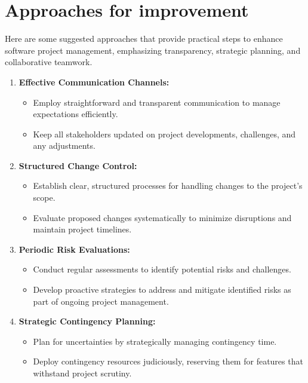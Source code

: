 \documentclass[12pt]{article}
\begin{document}
\section{Approaches for improvement }
Here are some suggested approaches that provide practical steps to enhance software project management, emphasizing transparency, strategic planning, and collaborative teamwork.
   \begin{enumerate}
               \item \textbf{Effective Communication Channels:} 
               \begin{itemize}
                    \item  Employ straightforward and transparent communication to manage expectations efficiently.
                    \item Keep all stakeholders updated on project developments, challenges, and any adjustments. 
                \end{itemize}
              \item  \textbf{Structured Change Control:}
              \begin{itemize}
                    \item Establish clear, structured processes for handling changes to the project's scope.
                    \item Evaluate proposed changes systematically to minimize disruptions and maintain project timelines. 
                \end{itemize}

            \item  \textbf{Periodic Risk Evaluations:}
              \begin{itemize}
                    \item Conduct regular assessments to identify potential risks and challenges.
                    \item Develop proactive strategies to address and mitigate identified risks as part of ongoing project management.
                \end{itemize}

                        \item  \textbf{Strategic Contingency Planning:}
              \begin{itemize}
                    \item Plan for uncertainties by strategically managing contingency time.
                    \item Deploy contingency resources judiciously, reserving them for features that withstand project scrutiny.
                \end{itemize}


\end{enumerate}
\end{document}
